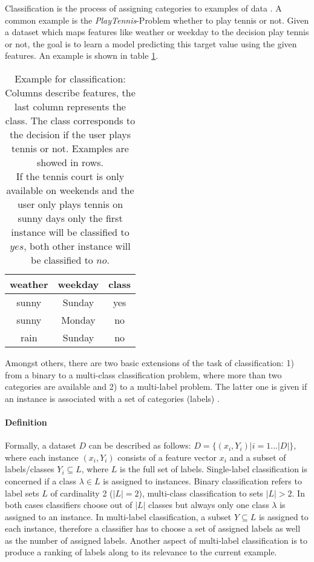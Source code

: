 		Classification is the process of assigning categories to examples of data \cite{mitchell97}. A common example is the \textit{PlayTennis}-Problem whether to play tennis or not. Given a dataset which maps features like weather or weekday to the decision play tennis or not, the goal is to learn a model predicting this target value using the given features. An example is shown in table \ref{tab:tennis}.

			\begin{table}
				\begin{center}
					\begin{tabular}{|c|c|c|}
						\hline
						weather & weekday & class \\ 
						\hline \hline 
						sunny & Sunday & yes \\ 
						\hline 
						sunny & Monday & no \\ 
						\hline 
						rain & Sunday & no \\ 
						\hline 
					\end{tabular}
				\caption{Example for classification: Columns describe features, the last column represents the class. The class corresponds to the decision if the user plays tennis or not. Examples are showed in rows.\\ If the tennis court is only available on weekends and the user only plays tennis on sunny days only the first instance will be classified to $yes$, both other instance will be classified to $no$. } 
				\label{tab:tennis}
			\end{center}
		\end{table}

		Amongst others, there are two basic extensions of the task of classification: 1) from a binary to a multi-class classification problem, where more than two categories are available and 2) to a multi-label problem. The latter one is given if an instance is associated with a set of categories (labels) \cite{Tsoumakas07}.

			\paragraph{Definition}
				Formally, a dataset $D$ can be described as follows: \mbox{$ D= \{(x_i,Y_i) | i=1...|D|\} $}, where each instance $(x_i,Y_i)$ consists of a feature vector $x_i$ and a subset of labels/classes $Y_i\subseteq L$, where $L$ is the full set of labels. Single-label classification is concerned if a class $ \lambda \in L $ is assigned to instances. Binary classification refers to label sets $L$ of cardinality 2 ($|L|=2$), multi-class classification to sets $ |L|>2 $. In both cases classifiers choose out of $|L|$ classes but always only one class $\lambda$ is assigned to an instance. In multi-label classification, a subset $ Y\subseteq L $ is assigned to each instance, therefore a classifier has to choose a set of assigned labels as well as the number of assigned labels. Another aspect of multi-label classification is to produce a ranking of labels along to its relevance to the current example.

